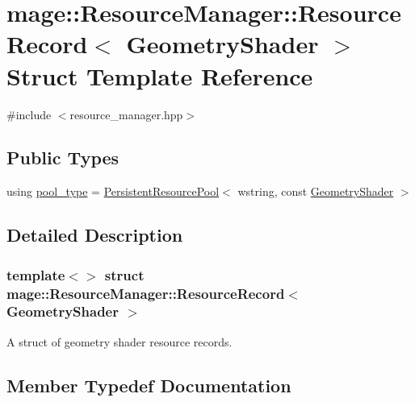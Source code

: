 \hypertarget{structmage_1_1_resource_manager_1_1_resource_record_3_01_geometry_shader_01_4}{}\section{mage\+:\+:Resource\+Manager\+:\+:Resource\+Record$<$ Geometry\+Shader $>$ Struct Template Reference}
\label{structmage_1_1_resource_manager_1_1_resource_record_3_01_geometry_shader_01_4}


{\ttfamily \#include $<$resource\+\_\+manager.\+hpp$>$}

\subsection*{Public Types}
\begin{DoxyCompactItemize}
\item 
using \hyperlink{structmage_1_1_resource_manager_1_1_resource_record_3_01_geometry_shader_01_4_a9ae3385e1d14f1541b1a8cc95263c796}{pool\+\_\+type} = \hyperlink{classmage_1_1_persistent_resource_pool}{Persistent\+Resource\+Pool}$<$ wstring, const \hyperlink{namespacemage_a0cf0bb4b74903e78658c96412d5687a6}{Geometry\+Shader} $>$
\end{DoxyCompactItemize}


\subsection{Detailed Description}
\subsubsection*{template$<$$>$\newline
struct mage\+::\+Resource\+Manager\+::\+Resource\+Record$<$ Geometry\+Shader $>$}

A struct of geometry shader resource records. 

\subsection{Member Typedef Documentation}
\hypertarget{structmage_1_1_resource_manager_1_1_resource_record_3_01_geometry_shader_01_4_a9ae3385e1d14f1541b1a8cc95263c796}{}\label{structmage_1_1_resource_manager_1_1_resource_record_3_01_geometry_shader_01_4_a9ae3385e1d14f1541b1a8cc95263c796} 
